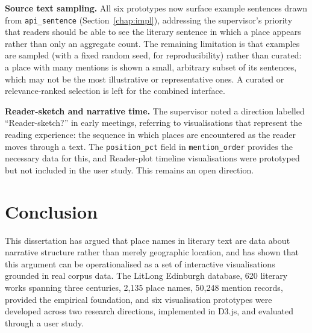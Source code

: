 \documentclass[logo,msc]{infthesis}
\begin{document}
\textbf{Source text sampling.} All six prototypes now surface example sentences drawn from \texttt{api\_sentence} (Section~\ref{chap:impl}), addressing the supervisor's priority that readers should be able to see the literary sentence in which a place appears rather than only an aggregate count. The remaining limitation is that examples are sampled (with a fixed random seed, for reproducibility) rather than curated: a place with many mentions is shown a small, arbitrary subset of its sentences, which may not be the most illustrative or representative ones. A curated or relevance-ranked selection is left for the combined interface.
 
\textbf{Reader-sketch and narrative time.} The supervisor noted a direction labelled ``Reader-sketch?'' in early meetings, referring to visualisations that represent the reading experience: the sequence in which places are encountered as the reader moves through a text. The \texttt{position\_pct} field in \texttt{mention\_order} provides the necessary data for this, and Reader-plot timeline visualisations were prototyped but not included in the user study. This remains an open direction.
 
 
\chapter{Conclusion}
\label{chap:conclusion}
 
This dissertation has argued that place names in literary text are data about narrative structure rather than merely geographic location, and has shown that this argument can be operationalised as a set of interactive visualisations grounded in real corpus data. The LitLong Edinburgh database, 620 literary works spanning three centuries, 2,135 place names, 50,248 mention records, provided the empirical foundation, and six visualisation prototypes were developed across two research directions, implemented in D3.js, and evaluated through a user study.
\end{document}
